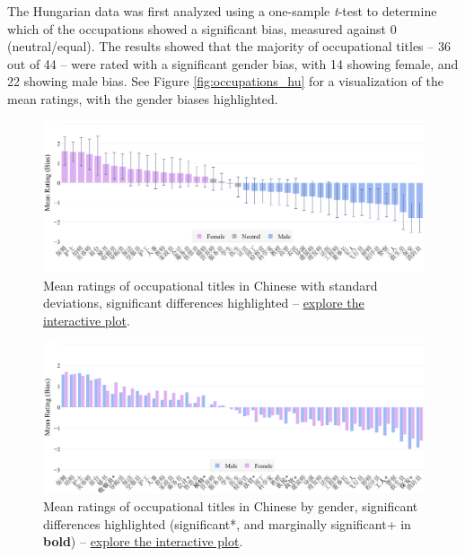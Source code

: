 \documentclass[11pt]{article}
\begin{document}
The Hungarian data was first analyzed using a one-sample \textit{t}-test to determine which of the occupations showed a significant bias, measured against 0 (neutral/equal). The results showed that the majority of occupational titles -- 36 out of 44 -- were rated with a significant gender bias, with 14 showing female, and 22 showing male bias. See Figure \ref{fig:occupations_hu} for a visualization of the mean ratings, with the gender biases highlighted.


\begin{figure}[!ht]
  \centering
  \includegraphics[width=\linewidth]{../occupations_zh}
  \caption{Mean ratings of occupational titles in Chinese with standard deviations, significant differences highlighted -- \href{https://htmlpreview.github.io/?https://github.com/partigabor/occupational-bias/blob/main/occupations_zh.html}{explore the interactive plot}.}
  \label{fig:occupations_zh}
\end{figure}

\begin{figure}[tbp]
  \centering
  \includegraphics[width=\linewidth]{../occupations_zh_gender}
  \caption{Mean ratings of occupational titles in Chinese by gender, significant differences highlighted (significant*, and marginally significant+ in \textbf{bold}) -- \href{https://htmlpreview.github.io/?https://github.com/partigabor/occupational-bias/blob/main/occupations_zh_gender.html}{explore the interactive plot}.}
  \label{fig:occupations_zh_gender}
\end{figure}
\end{document}
